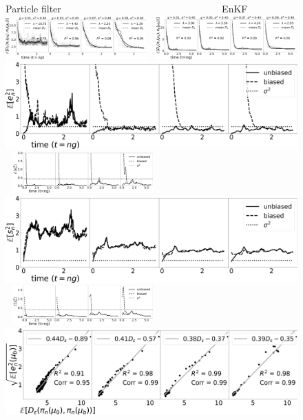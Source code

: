 \begin{figure}[t!]
\centering
Particle filter $\qquad \qquad \qquad \qquad \qquad \qquad \qquad \qquad $ EnKF\\
    \includegraphics[width=0.48\textwidth]{probing-nfs/plots/plots-bpf-effect of obs gap-rate_obs_gap_all.png} $\ \ $
    \includegraphics[width=0.48\textwidth]{probing-nfs/plots/plots-enkf-effect of ob gap-rate_all.png}\\
   \includegraphics[width=0.48\columnwidth]{probing-nfs/plots/plots-bpf-effect of obs gap-l2_obs_gap_all.png} $\ \ $
    \includegraphics[width=0.48\textwidth]{probing-nfs/plots/plots-enkf-effect of ob gap-mean_l2error_all.png}\\
   \includegraphics[width=0.48\columnwidth]{probing-nfs/plots/plots-bpf-effect of obs gap-trace_obs_gap_all.png} $\ \ $
    \includegraphics[width=0.48\textwidth]{probing-nfs/plots/plots-enkf-effect of ob gap-mean_trace_all.png}\\
   \includegraphics[width=0.48\columnwidth]{probing-nfs/plots/plots-bpf-effect of obs gap-dvl2_obs_gap_all.png} $\ \ $

\end{figure}
